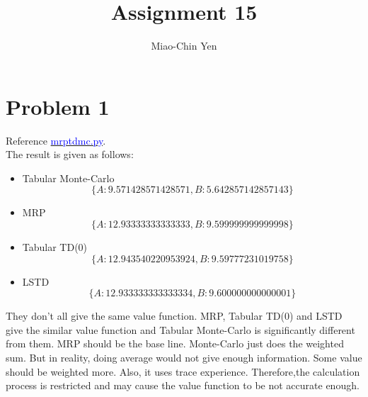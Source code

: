 \documentclass{article}
\title{Assignment 15}
\author{Miao-Chin Yen}
\begin{document}
\maketitle

\section*{Problem 1}
Reference \href{https://github.com/miaochin/RL-book/tree/master/CME241_assignments/assignment15}{\textcolor{blue}{mrp\textunderscore tdmc.py}}.\\
The result is given as follows:
\begin{itemize}
\item Tabular Monte-Carlo
$$ \{A: 9.571428571428571, B: 5.642857142857143\}$$
\item MRP
$$ \{A: 12.93333333333333, B: 9.599999999999998\}$$
\item Tabular TD(0)
$$\{A: 12.943540220953924, B: 9.59777231019758\} $$
\item LSTD
$$\{A:12.933333333333334, B: 9.600000000000001\}$$
\end{itemize}
They don't all give the same value function. MRP, Tabular TD(0) and LSTD give the similar value function and Tabular Monte-Carlo is significantly different from them. MRP should be the base line. Monte-Carlo just does the weighted sum. But in reality, doing average would not give enough information. Some value should be weighted more. Also, it uses trace experience. Therefore,the calculation process is restricted and may cause the value function to be not accurate enough.
\end{document}
